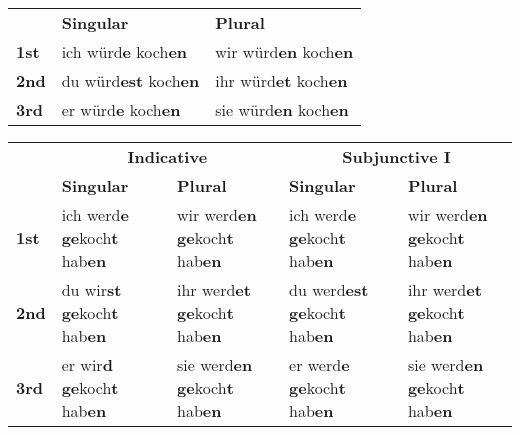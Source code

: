 \documentclass[a4paper,20pt]{article}
\newcommand{\grammarending}[1]{\textbf{\textcolor{endingcolor}{#1}}}
\begin{document}
\begin{tabular}{|l|l|l|}
\hline
\rowcolor{lightgray}
\multicolumn{3}{|c|}{\textbf{Future I - Subjunctive II}} \\
\hline
\rowcolor{lightgray}
& \textbf{Singular} & \textbf{Plural} \\
\hline
\textbf{1st} & ich würd\grammarending{e} koch\grammarending{en} & wir würd\grammarending{en} koch\grammarending{en} \\
\hline
\textbf{2nd} & du würd\grammarending{est} koch\grammarending{en} & ihr würd\grammarending{et} koch\grammarending{en} \\
\hline
\textbf{3rd} & er würd\grammarending{e} koch\grammarending{en} & sie würd\grammarending{en} koch\grammarending{en} \\
\hline
\end{tabular}

\begin{tabular}{|l|l|l|l|l|}
\hline
\rowcolor{lightgray}
\multicolumn{5}{|c|}{\textbf{Future II}} \\
\hline
\rowcolor{lightgray}
& \multicolumn{2}{c|}{\textbf{Indicative}} & \multicolumn{2}{c|}{\textbf{Subjunctive I}} \\
\hline
\rowcolor{lightgray}
& \textbf{Singular} & \textbf{Plural} & \textbf{Singular} & \textbf{Plural} \\
\hline
\textbf{1st} & ich werd\grammarending{e} \grammarending{ge}koch\grammarending{t} hab\grammarending{en} & wir werd\grammarending{en} \grammarending{ge}koch\grammarending{t} hab\grammarending{en} & ich werd\grammarending{e} \grammarending{ge}koch\grammarending{t} hab\grammarending{en} & wir werd\grammarending{en} \grammarending{ge}koch\grammarending{t} hab\grammarending{en} \\
\hline
\textbf{2nd} & du wir\grammarending{st} \grammarending{ge}koch\grammarending{t} hab\grammarending{en} & ihr werd\grammarending{et} \grammarending{ge}koch\grammarending{t} hab\grammarending{en} & du werd\grammarending{est} \grammarending{ge}koch\grammarending{t} hab\grammarending{en} & ihr werd\grammarending{et} \grammarending{ge}koch\grammarending{t} hab\grammarending{en} \\
\hline
\textbf{3rd} & er wir\grammarending{d} \grammarending{ge}koch\grammarending{t} hab\grammarending{en} & sie werd\grammarending{en} \grammarending{ge}koch\grammarending{t} hab\grammarending{en} & er werd\grammarending{e} \grammarending{ge}koch\grammarending{t} hab\grammarending{en} & sie werd\grammarending{en} \grammarending{ge}koch\grammarending{t} hab\grammarending{en} \\
\hline
\end{tabular}
\end{document}
